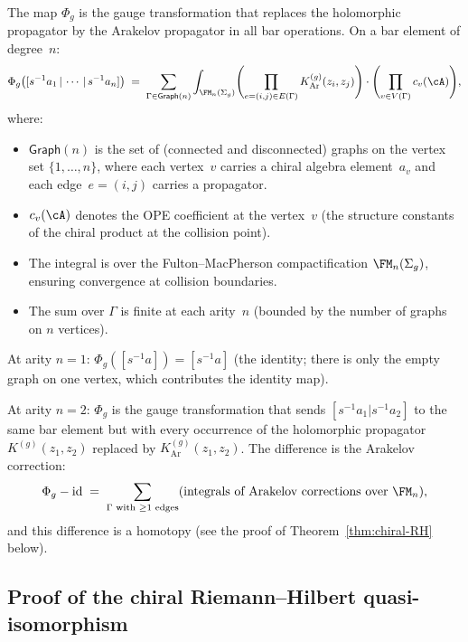 \begin{construction}
\label{constr:chiral-exp-map}
The map $\Phi_g$ is the gauge transformation that replaces the
holomorphic propagator by the Arakelov propagator in all bar
operations. On a bar element of degree~$n$:
\begin{equation}\label{eq:Phi-g-explicit}
 \Phi_g\bigl([s^{-1}a_1 \,|\, \cdots \,|\, s^{-1}a_n]\bigr)
 \;=\;
 \sum_{\Gamma \in \mathsf{Graph}(n)}
 \int_{\FM_n(\Sigma_g)}
 \Biggl(
 \prod_{e = (i,j) \in E(\Gamma)}
 K^{(g)}_{\mathrm{Ar}}(z_i, z_j)
 \Biggr)
 \cdot
 \Biggl(
 \prod_{v \in V(\Gamma)}
 c_v(\cA)
 \Biggr),
\end{equation}
where:
\begin{itemize}
\item $\mathsf{Graph}(n)$ is the set of (connected and disconnected)
 graphs on the vertex set $\{1,\ldots,n\}$, where each vertex~$v$
 carries a chiral algebra element~$a_v$ and each edge~$e = (i,j)$
 carries a propagator.
\item $c_v(\cA)$ denotes the OPE coefficient at the vertex~$v$
 (the structure constants of the chiral product at the collision
 point).
\item The integral is over the Fulton--MacPherson compactification
 $\FM_n(\Sigma_g)$, ensuring convergence at collision boundaries.
\item The sum over $\Gamma$ is finite at each arity~$n$ (bounded by
 the number of graphs on $n$ vertices).
\end{itemize}
At arity $n = 1$: $\Phi_g([s^{-1}a]) = [s^{-1}a]$ (the identity;
there is only the empty graph on one vertex, which contributes the
identity map).

At arity $n = 2$: $\Phi_g$ is the gauge transformation that sends
$[s^{-1}a_1 | s^{-1}a_2]$ to the same bar element but with every
occurrence of the holomorphic propagator $K^{(g)}(z_1,z_2)$ replaced
by $K^{(g)}_{\mathrm{Ar}}(z_1,z_2)$. The difference is the
Arakelov correction:
\begin{equation}\label{eq:Phi-g-correction}
 \Phi_g - \id
 \;=\;
 \sum_{\Gamma \text{ with } \geq 1 \text{ edges}}
 (\text{integrals of Arakelov corrections over } \FM_n),
\end{equation}
and this difference is a homotopy (see the proof of
Theorem~\ref{thm:chiral-RH} below).
\end{construction}

\subsection{Proof of the chiral Riemann--Hilbert quasi-isomorphism}
\label{subsec:chiral-RH-proof}

